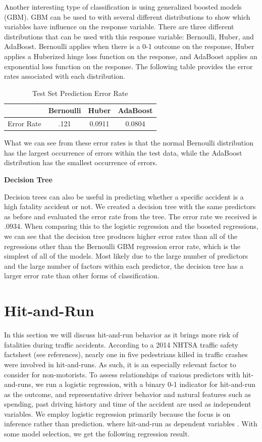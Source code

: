 \documentclass[11pt, oneside,titlepage]{article}   	%
\begin{document}
Another interesting type of classification is using generalized boosted models (GBM). GBM can be used to with several different distributions to show which variables have influence on the response variable. There are three different distributions that can be used with this response variable: Bernoulli, Huber, and AdaBoost. Bernoulli applies when there is a 0-1 outcome on the response, Huber applies a Huberized hinge loss function on the response, and AdaBoost applies an exponential loss function on the response. The following table provides the error rates associated with each distribution.

\begin{table}[H]
\centering
\begin{tabular}{cccc}
  \hline
 & Bernoulli & Huber & AdaBoost \\ 
  \hline
Error Rate & .121 & 0.0911 & 0.0804 \\ 
   \hline
\end{tabular}
\caption{Test Set Prediction Error Rate} 
\end{table}

What we can see from these error rates is that the normal Bernoulli distribution has the largest occurrence of errors within the test data, while the AdaBoost distribution has the smallest occurrence of errors.

\textbf{Decision Tree}

Decision trees can also be useful in predicting whether a specific accident is a high fatality accident or not. We created a decision tree with the same predictors as before and evaluated the error rate from the tree. The error rate we received is .0934. When comparing this to the logistic regression and the boosted regressions, we can see that the decision tree produces higher error rates than all of the regressions other than the Bernoulli GBM regression error rate, which is the simplest of all of the models. Most likely due to the large number of predictors and the large number of factors within each predictor, the decision tree has a larger error rate than other forms of classification.

\section*{Hit-and-Run}
In this section we will discuss hit-and-run behavior as it brings more risk of fatalities during traffic accidents. According to a 2014 NHTSA traffic safety factsheet (see references), nearly one in five pedestrians killed in traffic crashes were involved in hit-and-runs. As such, it is an especially relevant factor to consider for non-motorists. To assess relationships of various predictors with hit-and-runs, we run a logistic regression, with a binary 0-1 indicator for hit-and-run as the outcome, and representative driver behavior and natural features such as spending, past driving history and time of the accident are used as independent variables. We employ logistic regression primarily because the focus is on inference rather than prediction. where hit-and-run as dependent variables . With some model selection, we get the following regression result.
\end{document}
